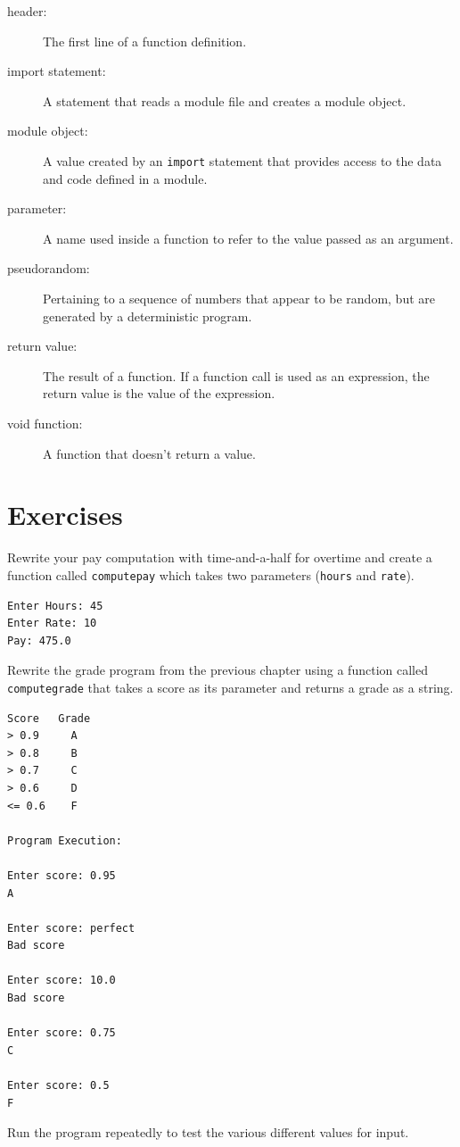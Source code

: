 \documentclass[10pt]{book}
\begin{document}
\begin{description}
\item[header:] The first line of a function definition.

\item[import statement:] A statement that reads a module file and creates
a module object.

\item[module object:] A value created by an {\tt import} statement
that provides access to the data and code defined in a module.

\item[parameter:] A name used inside a function to refer to the value
passed as an argument.

\item[pseudorandom:] Pertaining to a sequence of numbers that appear
to be random, but are generated by a deterministic program.

\item[return value:]  The result of a function.  If a function call
is used as an expression, the return value is the value of
the expression.

\item[void function:] A function that doesn't return a value.


\end{description}


\section{Exercises}

\begin{ex}
Rewrite your pay computation with time-and-a-half for overtime
and create a function called {\tt computepay} which takes
two parameters ({\tt hours} and {\tt rate}).

\begin{verbatim}
Enter Hours: 45
Enter Rate: 10
Pay: 475.0
\end{verbatim}
\end{ex}

\begin{ex}
Rewrite the grade program from the previous chapter 
using a function called {\tt computegrade} that takes
a score as its parameter and returns a grade as a string.

\begin{verbatim}
Score   Grade
> 0.9     A
> 0.8     B
> 0.7     C
> 0.6     D
<= 0.6    F

Program Execution:

Enter score: 0.95
A

Enter score: perfect
Bad score

Enter score: 10.0
Bad score

Enter score: 0.75
C

Enter score: 0.5
F
\end{verbatim}

Run the program repeatedly to test the various different values
for input.
\end{ex}
\end{document}
